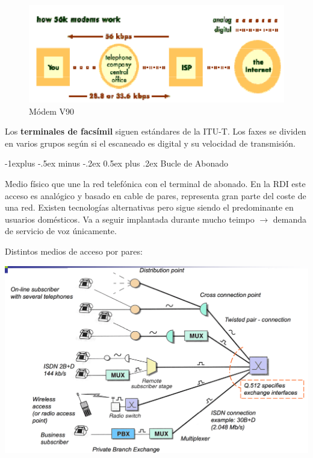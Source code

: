 \documentclass[10pt,portrait, twocolumn]{article}
\makeatletter
\renewcommand{\subsection}{\@startsection{subsection}{2}{0mm}%
                                {-1explus -.5ex minus -.2ex}%
                                {0.5ex plus .2ex}%
                                {\normalfont\normalsize\bfseries}}
\makeatother
\begin{document}
	\begin{figure}[!ht]
 		\centering
  		 \includegraphics[scale = 0.25]{images/ModemV90}
		\caption{Módem V90}
	\end{figure}

Los \textbf{terminales de facsímil} siguen estándares de la ITU-T. Los faxes se dividen en varios grupos según si el escaneado es digital y su velocidad de transmisión.

\hrulefill

\subsection{Bucle de Abonado}

Medio físico que une la red telefónica con el terminal de abonado. En la RDI este acceso es analógico y basado en cable de pares, representa gran parte del coste de una red. Existen tecnologías alternativas pero sigue siendo el predominante en usuarios domésticos. Va a seguir implantada durante mucho teimpo $\rightarrow$ demanda de servicio de voz únicamente.

Distintos medios de acceso por pares:

	\begin{center}
		\includegraphics[scale=0.2]{images/BucleIntro}
	\end{center}
\end{document}
